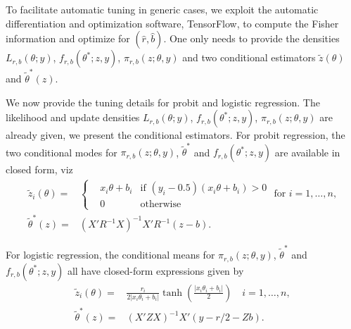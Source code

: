 \documentclass[twoside,11pt]{article}
\newcommand{\1}{\mathbf 1}
\begin{document}
{To facilitate automatic tuning in generic cases, we exploit the automatic differentiation and  optimization software, TensorFlow, to compute the Fisher information and optimize for $(\hat r, \hat b)$. One only needs to provide the densities $L_{r,b}(\theta;y)$, $f_{r,b}(\theta^*;z,y)$, $\pi_{r,b}(z;\theta,y)$ and two conditional estimators $\tilde z(\theta)$ and $\tilde \theta^*(z)$.

We now provide the tuning details for probit and logistic regression. The likelihood and update densities $L_{r,b}(\theta;y)$, $f_{r,b}(\theta^*;z,y)$, $\pi_{r,b}(z;\theta,y)$ are already given, we present the conditional estimators. For probit regression, the two conditional modes for $\pi_{r,b}(z;\theta,y)$,  $\tilde \theta^*$ and $f_{r,b}(\theta^*;z,y)$  are available in closed form, viz
\begin{equation*}
	\begin{aligned}
    \tilde z_i(\theta) = & \left\{ 
    \begin{array}{lll}
         & x_i\theta +b_i &\text{if } (y_i-0.5)  (x_i\theta +b_i)>0\\
         & 0 &\text{otherwise}
    \end{array} \right. \text{ for } i=1,\ldots,n, \\
    \tilde \theta^*(z) = & (X'R^{-1}X)^{-1} X'R^{-1}(z-b).
	\end{aligned}
\end{equation*}

For logistic regression, the conditional means for $\pi_{r,b}(z;\theta,y)$,  $\tilde \theta^*$ and $f_{r,b}(\theta^*;z,y)$ all have closed-form expressions given by
\begin{equation*}
	\begin{aligned}
    \tilde z_i(\theta) = &  \frac{r_i}{2|x_i\theta_i+b_i|} \tanh(\frac{|x_i\theta_i+b_i|}{2}) \quad i=1,\ldots,n, \\
    \tilde \theta^*(z) = & (X' Z X)^{-1}  X'  (y -r/2- Zb).
	\end{aligned}
\end{equation*}



{
}}
\end{document}
